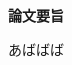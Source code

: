 \documentclass[../main]{subfiles}
\begin{document}
\thispagestyle{empty}
\begin{center}
    {\Huge \textbf{論文要旨}}
\end{center}
\vspace{0.5cm}

あばばば

\newpage
\end{document}

